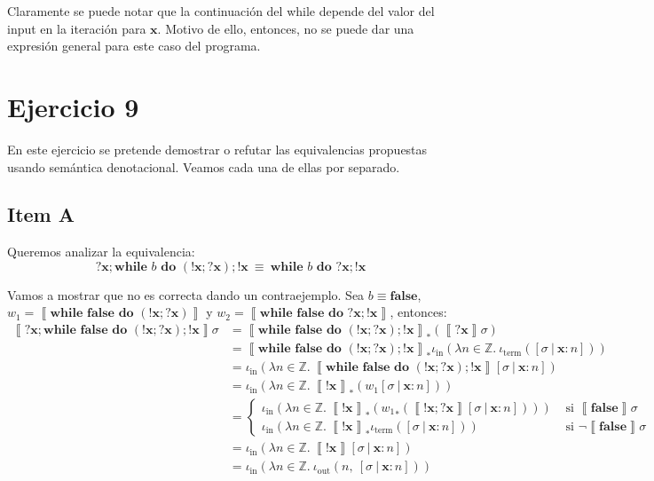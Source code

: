 \documentclass{article}
\newcommand{\sem}[1]{\left\llbracket #1\right\rrbracket}
\newcommand{\Z}{\mathbb{Z}}
\newcommand{\x}{\textbf{x}}
\newcommand{\cfalse}{\textbf{false}}
\newcommand{\cwhile}[2]{\textbf{while }#1\textbf{ do }#2}
\newcommand{\iterm}[1]{\iota_\text{term}\left(#1\right)}
\newcommand{\iout}[2]{\iota_\text{out}\left(#1,\ #2\right)}
\newcommand{\iin}[2]{\iota_\text{in}\left(\lambda #1 \in \Z .\ #2\right)}
\begin{document}
Claramente se puede notar que la continuación del while depende del valor del input en la iteración para $\x$.
Motivo de ello, entonces, no se puede dar una expresión general para este caso del programa.

\section*{Ejercicio 9}
En este ejercicio se pretende demostrar o refutar las equivalencias propuestas usando semántica denotacional.
Veamos cada una de ellas por separado.

\subsection*{Item A}
Queremos analizar la equivalencia:
\begin{equation*}
  ?\x; \cwhile{b}{(!\x; ?\x)}; !\x \ \equiv \ \cwhile{b}{?\x; !\x}
\end{equation*}

Vamos a mostrar que no es correcta dando un contraejemplo.
Sea $b \equiv \cfalse$, $w_1 = \sem{\cwhile{\cfalse}{(!\x;?\x)}}$ y $w_2 = \sem{\cwhile{\cfalse}{?\x;!\x}}$, entonces:
\begin{equation*}
  \begin{aligned}
    \sem{?\x; \cwhile{\cfalse}{(!\x; ?\x)}; !\x} \sigma &= \sem{\cwhile{\cfalse}{(!\x; ?\x)}; !\x}_* (\sem{?\x}\sigma) \\ 
                                                        &= \sem{\cwhile{\cfalse}{(!\x; ?\x)}; !\x}_* \iin{n}{\iterm{[\sigma\ |\ \x : n]}} \\ 
                                                        &= \iin{n}{\sem{\cwhile{\cfalse}{(!\x; ?\x)}; !\x} [\sigma\ |\ \x : n]} \\ 
                                                        &= \iin{n}{\sem{!\x}_* (w_1[\sigma\ |\ \x : n])} \\ 
                                                        &= \begin{cases}
                                                          \iin{n}{\sem{!\x}_* ({w_1}_* (\sem{!\x; ?\x}[\sigma\ |\ \x : n]))} &\text{ si } \sem{\cfalse}\sigma \\ 
                                                          \iin{n}{\sem{!\x}_* \iterm{[\sigma\ |\ \x : n]}} &\text{ si }\neg\sem{\cfalse}\sigma
                                                        \end{cases} \\ 
                                                        &= \iin{n}{\sem{!\x} [\sigma\ |\ \x : n]} \\ 
                                                        &= \iin{n}{\iout{n}{[\sigma\ |\ \x : n]}}
  \end{aligned}
\end{equation*}
\end{document}
